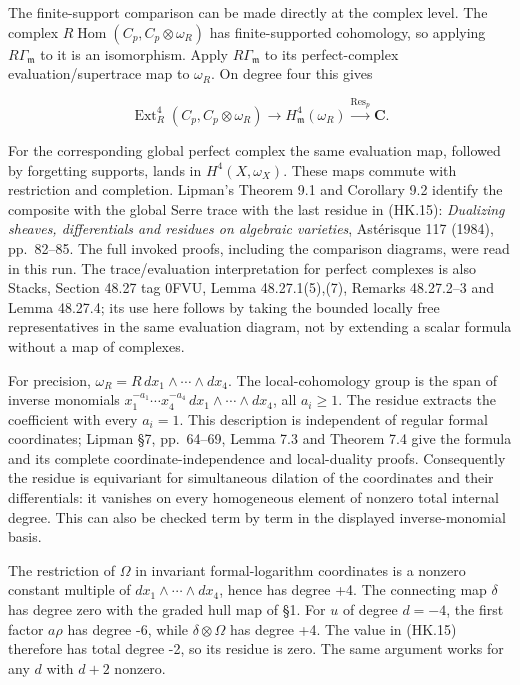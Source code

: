 The finite-support comparison can be made directly at the complex
level. The complex \(R\operatorname{Hom}(C_p,C_p\otimes\omega_R)\) has finite-supported
cohomology, so applying \(R\Gamma_{\mathfrak m}\) to it is an isomorphism. Apply \(R\Gamma_{\mathfrak m}\) to
its perfect-complex evaluation/supertrace map to \(\omega_R\). On degree
four this gives

\[
 \operatorname{Ext}^4_R(C_p,C_p\otimes\omega_R)
   \longrightarrow H^4_{\mathfrak m}(\omega_R)
   \xrightarrow{\operatorname{Res}_p}\mathbf C.
 \tag{HK.15}
\]

For the corresponding global perfect complex the same evaluation
map, followed by forgetting supports, lands in \(H^4(X,\omega_X)\).
These maps commute with restriction and completion. Lipman's
Theorem 9.1 and Corollary 9.2 identify the composite with the global
Serre trace with the last residue in (HK.15): \emph{Dualizing sheaves,
differentials and residues on algebraic varieties}, Astérisque 117
(1984), pp.~82--85.\cite{SFLipman1984} The full invoked proofs, including the comparison
diagrams, were read in this run. The trace/evaluation interpretation
for perfect complexes is also Stacks, Section 48.27 tag 0FVU,
Lemma 48.27.1(5),(7), Remarks 48.27.2--3 and Lemma 48.27.4;\cite{SFStacksE846Duality} its use
here follows by taking the bounded locally free representatives
in the same evaluation diagram, not by extending a scalar formula
without a map of complexes.

For precision, \(\omega_R=R\,dx_1\wedge\cdots\wedge dx_4\). The local-cohomology
group is the span of inverse monomials \(x_1^{-a_1}\cdots x_4^{-a_4}\,dx_1\wedge\cdots\wedge dx_4\),
all \(a_i\ge1\). The residue extracts the coefficient with every \(a_i=1\).
This description is independent of regular formal coordinates;
Lipman §7, pp.~64--69, Lemma 7.3 and Theorem 7.4 give the formula and
its complete coordinate-independence and local-duality proofs.
Consequently the residue is equivariant for simultaneous dilation
of the coordinates and their differentials: it vanishes on every
homogeneous element of nonzero total internal degree. This can
also be checked term by term in the displayed inverse-monomial basis.

The restriction of \(\Omega\) in invariant formal-logarithm coordinates
is a nonzero constant multiple of \(dx_1\wedge\cdots\wedge dx_4\), hence
has degree +4. The connecting map \(\delta\) has degree zero with the
graded hull map of §1. For \(u\) of degree \(d=-4\), the first factor \(a\rho\)
has degree -6, while \(\delta\otimes\Omega\) has degree +4. The value
in (HK.15) therefore has total degree -2, so its residue is zero.
The same argument works for any \(d\) with \(d+2\) nonzero.

